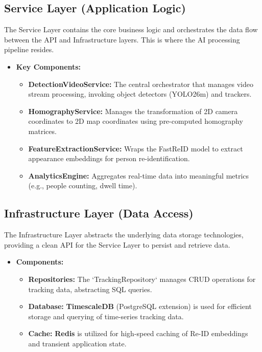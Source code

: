 \subsection{Service Layer (Application Logic)}
\label{subsection:service-layer}
The Service Layer contains the core business logic and orchestrates the data flow between the API and Infrastructure layers. This is where the AI processing pipeline resides.
\begin{itemize}
    \item \textbf{Key Components:}
    \begin{itemize}
        \item \textbf{DetectionVideoService:} The central orchestrator that manages video stream processing, invoking object detectors (YOLO26m) and trackers.
        \item \textbf{HomographyService:} Manages the transformation of 2D camera coordinates to 2D map coordinates using pre-computed homography matrices.
        \item \textbf{FeatureExtractionService:} Wraps the FastReID model to extract appearance embeddings for person re-identification.
        \item \textbf{AnalyticsEngine:} Aggregates real-time data into meaningful metrics (e.g., people counting, dwell time).
    \end{itemize}
\end{itemize}

\subsection{Infrastructure Layer (Data Access)}
\label{subsection:infrastructure-layer}
The Infrastructure Layer abstracts the underlying data storage technologies, providing a clean API for the Service Layer to persist and retrieve data.
\begin{itemize}
    \item \textbf{Components:}
    \begin{itemize}
        \item \textbf{Repositories:} The `TrackingRepository` manages CRUD operations for tracking data, abstracting SQL queries.
        \item \textbf{Database:} \textbf{TimescaleDB} (PostgreSQL extension) is used for efficient storage and querying of time-series tracking data.
        \item \textbf{Cache:} \textbf{Redis} is utilized for high-speed caching of Re-ID embeddings and transient application state.
    \end{itemize}
\end{itemize}

